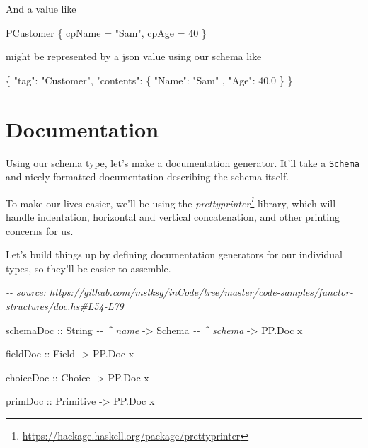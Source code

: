 \documentclass[]{article}
\newenvironment{Shaded}{}{}
\newcommand{\CommentTok}[1]{\textcolor[rgb]{0.38,0.63,0.69}{\textit{#1}}}
\newcommand{\DataTypeTok}[1]{\textcolor[rgb]{0.56,0.13,0.00}{#1}}
\newcommand{\DecValTok}[1]{\textcolor[rgb]{0.25,0.63,0.44}{#1}}
\newcommand{\FloatTok}[1]{\textcolor[rgb]{0.25,0.63,0.44}{#1}}
\newcommand{\FunctionTok}[1]{\textcolor[rgb]{0.02,0.16,0.49}{#1}}
\newcommand{\NormalTok}[1]{#1}
\newcommand{\OtherTok}[1]{\textcolor[rgb]{0.00,0.44,0.13}{#1}}
\newcommand{\StringTok}[1]{\textcolor[rgb]{0.25,0.44,0.63}{#1}}
\renewcommand{\href}[2]{#2\footnote{\url{#1}}}
\begin{document}
And a value like

\begin{Shaded}
\begin{Highlighting}[]
\DataTypeTok{PCustomer}\NormalTok{ \{ cpName }\OtherTok{=} \StringTok{"Sam"}\NormalTok{, cpAge }\OtherTok{=} \DecValTok{40}\NormalTok{ \}}
\end{Highlighting}
\end{Shaded}

might be represented by a json value using our schema like

\begin{Shaded}
\begin{Highlighting}[]
\FunctionTok{\{} \DataTypeTok{"tag"}\FunctionTok{:} \StringTok{"Customer"}\FunctionTok{,}
  \DataTypeTok{"contents"}\FunctionTok{:}
    \FunctionTok{\{} \DataTypeTok{"Name"}\FunctionTok{:} \StringTok{"Sam"}
    \FunctionTok{,} \DataTypeTok{"Age"}\FunctionTok{:} \FloatTok{40.0}
    \FunctionTok{\}}
\FunctionTok{\}}
\end{Highlighting}
\end{Shaded}

\section{Documentation}\label{documentation}

Using our schema type, let's make a documentation generator. It'll take a
\texttt{Schema} and nicely formatted documentation describing the schema itself.

To make our lives easier, we'll be using the
\emph{\href{https://hackage.haskell.org/package/prettyprinter}{prettyprinter}}
library, which will handle indentation, horizontal and vertical concatenation,
and other printing concerns for us.

Let's build things up by defining documentation generators for our individual
types, so they'll be easier to assemble.

\begin{Shaded}
\begin{Highlighting}[]
\CommentTok{{-}{-} source: https://github.com/mstksg/inCode/tree/master/code{-}samples/functor{-}structures/doc.hs\#L54{-}L79}

\NormalTok{schemaDoc}
\OtherTok{    ::} \DataTypeTok{String}       \CommentTok{{-}{-} \^{} name}
    \OtherTok{{-}\textgreater{}} \DataTypeTok{Schema}       \CommentTok{{-}{-} \^{} schema}
    \OtherTok{{-}\textgreater{}} \DataTypeTok{PP.Doc}\NormalTok{ x}

\OtherTok{fieldDoc ::} \DataTypeTok{Field} \OtherTok{{-}\textgreater{}} \DataTypeTok{PP.Doc}\NormalTok{ x}

\OtherTok{choiceDoc ::} \DataTypeTok{Choice} \OtherTok{{-}\textgreater{}} \DataTypeTok{PP.Doc}\NormalTok{ x}

\OtherTok{primDoc ::} \DataTypeTok{Primitive} \OtherTok{{-}\textgreater{}} \DataTypeTok{PP.Doc}\NormalTok{ x}
\end{Highlighting}
\end{Shaded}
\end{document}
